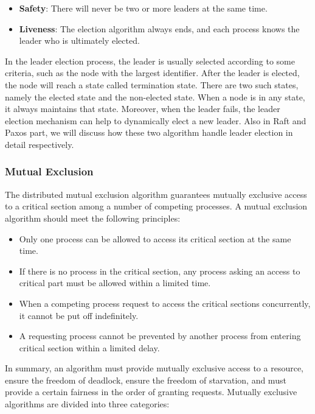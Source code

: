 \documentclass[12pt, a4paper]{article}
\begin{document}
\begin{itemize}
  \item \textbf{Safety}: There will never be two or more leaders at the same
  time.
  \item \textbf{Liveness}: The election algorithm always ends, and each process
  knows the leader who is ultimately elected.
\end{itemize}

In the leader election process, the leader is usually selected according to
some criteria, such as the node with the largest identifier\cite{effatparvar2010improved}. After the leader is elected, the node will reach a state called termination state. There are two such states, namely the elected state and the non-elected state. When a node is in any state, it always maintains that state. Moreover, when the leader fails, the leader election mechanism can help to dynamically elect a new leader. Also in Raft and Paxos part, we will discuss how these two algorithm handle leader election in detail respectively.

\subsubsection{Mutual Exclusion}

The distributed mutual exclusion algorithm guarantees mutually exclusive access
to a critical section among a number of competing
processes\cite{lamport1987fast}. A mutual exclusion algorithm should meet the
following principles\cite{velazques1993survey}:

\begin{itemize}
  \item \textbf{}Only one process can be allowed to access its critical
  section at the same time.
  \item \textbf{}If there is no process in the critical section, any
  process asking an access to critical part must be allowed within a limited
  time.
  \item \textbf{}When a competing process request to access the critical
  sections concurrently, it cannot be put off indefinitely.
  \item \textbf{}A requesting process cannot be prevented by another process
  from entering critical section within a limited delay.
\end{itemize}

In summary, an algorithm must provide mutually exclusive access to a resource,
ensure the freedom of deadlock, ensure the freedom of starvation, and must
provide a certain fairness in the order of granting requests. Mutually exclusive
algorithms are divided into three categories:
\end{document}
